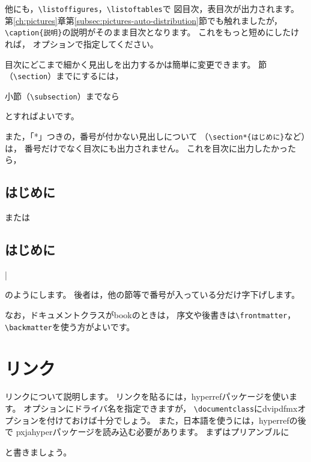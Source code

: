\documentclass[class=jreport, crop=false, preview=false, dvipdfmx, fleqn]{standalone}
\begin{document}
他にも，\verb|\listoffigures|，\verb|\listoftables|で
図目次，表目次が出力されます。
第\ref{ch:pictures}章第\ref{subsec:pictures-auto-distribution}節でも触れましたが，
\verb|\caption{説明}|の説明がそのまま目次となります。
これをもっと短めにしたければ，
オプションで指定してください。

目次にどこまで細かく見出しを出力するかは簡単に変更できます。
節（\verb|\section|）までにするには，
\begin{ITeX}
\setcounter{tocdepth}{1}
\end{ITeX}
小節（\verb|\subsection|）までなら
\begin{ITeX}
\setcounter{tocdepth}{2}
\end{ITeX}
とすればよいです。

また，「*」つきの，番号が付かない見出しについて
（\verb|\section*{はじめに}|など）は，
番号だけでなく目次にも出力されません。
これを目次に出力したかったら，
\begin{ITeX}
\section*{はじめに}
\end{ITeX}
または
\begin{ITeX}
\section*{はじめに}|
\end{ITeX}
のようにします。
後者は，他の節等で番号が入っている分だけ字下げします。

なお，ドキュメントクラスがbookのときは，
序文や後書きは\verb|\frontmatter|，\verb|\backmatter|を使う方がよいです。



\section{リンク}
リンクについて説明します。
リンクを貼るには，hyperrefパッケージを使います。
オプションにドライバ名を指定できますが，
\verb|\documentclass|にdvipdfmxオプションを付けておけば十分でしょう。
また，日本語を使うには，hyperrefの後で
pxjahyperパッケージを読み込む必要があります。
まずはプリアンブルに
\begin{ITeX}
\usepackage{hyperref}
\usepackage{pxjahyper}
\end{ITeX}
と書きましょう。
\end{document}
